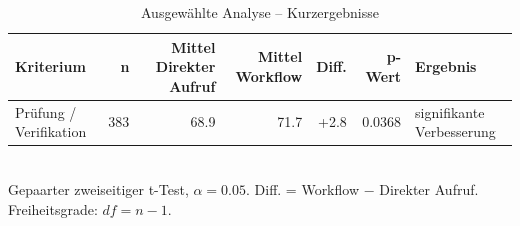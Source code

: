 \begin{table}[htbp]
\centering
\caption{Ausgewählte Analyse -- Kurzergebnisse}
\begin{tabular}{lrrrrrl}
\toprule
Kriterium & n & Mittel Direkter Aufruf & Mittel Workflow & Diff. & p-Wert & Ergebnis \\
\midrule
Prüfung / Verifikation & 383 & 68.9 & 71.7 & +2.8 & 0.0368 & signifikante Verbesserung \\
\bottomrule
\end{tabular}
\\[2mm]
\footnotesize Gepaarter zweiseitiger t-Test, $\alpha=0.05$. Diff. = Workflow $-$ Direkter Aufruf. Freiheitsgrade: $df=n-1$.
\end{table}
